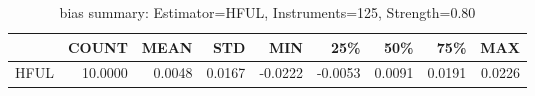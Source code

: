 \begin{table}[ht]
\centering
\caption{bias summary: Estimator=HFUL, Instruments=125, Strength=0.80}
\begin{tabular}{lrrrrrrrr}
\toprule
 & COUNT & MEAN & STD & MIN & 25\% & 50\% & 75\% & MAX \\
\midrule
HFUL & 10.0000 & 0.0048 & 0.0167 & -0.0222 & -0.0053 & 0.0091 & 0.0191 & 0.0226 \\
\bottomrule
\end{tabular}
\end{table}
